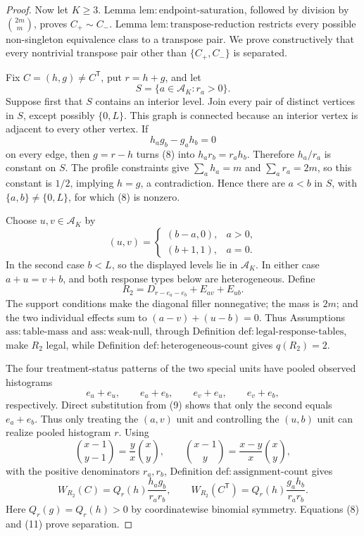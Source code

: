 \documentclass{article}
\begin{document}
\begin{proof}
Now let \(K\geq3\). Lemma \(\mathrm{lem{:}endpoint\text{-}saturation}\), followed by division by \(\binom{2m}{m}\), proves \(C_+\sim C_-\). Lemma \(\mathrm{lem{:}transpose\text{-}reduction}\) restricts every possible non-singleton equivalence class to a transpose pair. We prove constructively that every nontrivial transpose pair other than \(\{C_+,C_-\}\) is separated.

Fix \(C=(h,g)\neq C^{\mathsf T}\), put \(r=h+g\), and let
\[
 S=\{a\in\mathcal A_K:r_a>0\}.
\]
Suppose first that \(S\) contains an interior level. Join every pair of distinct vertices in \(S\), except possibly \(\{0,L\}\). This graph is connected because an interior vertex is adjacent to every other vertex. If
\[
 h_ag_b-g_ah_b=0
 \tag{8}
\]
on every edge, then \(g=r-h\) turns (8) into \(h_ar_b=r_ah_b\). Therefore \(h_a/r_a\) is constant on \(S\). The profile constraints give \(\sum_a h_a=m\) and \(\sum_a r_a=2m\), so this constant is \(1/2\), implying \(h=g\), a contradiction. Hence there are \(a<b\) in \(S\), with \(\{a,b\}\neq\{0,L\}\), for which (8) is nonzero.

Choose \(u,v\in\mathcal A_K\) by
\[
 (u,v)=
 \begin{cases}
 (b-a,0),&a>0,\\
 (b+1,1),&a=0.
 \end{cases}
 \tag{9}
\]
In the second case \(b<L\), so the displayed levels lie in \(\mathcal A_K\). In either case \(a+u=v+b\), and both response types below are heterogeneous. Define
\[
 R_2=D_{r-e_a-e_b}+E_{av}+E_{ub}.
 \tag{10}
\]
The support conditions make the diagonal filler nonnegative; the mass is \(2m\); and the two individual effects sum to \((a-v)+(u-b)=0\). Thus Assumptions \(\mathrm{ass{:}table\text{-}mass}\) and \(\mathrm{ass{:}weak\text{-}null}\), through Definition \(\mathrm{def{:}legal\text{-}response\text{-}tables}\), make \(R_2\) legal, while Definition \(\mathrm{def{:}heterogeneous\text{-}count}\) gives \(q(R_2)=2\).

The four treatment-status patterns of the two special units have pooled observed histograms
\[
 e_a+e_u,\qquad e_a+e_b,\qquad e_v+e_u,\qquad e_v+e_b,
\]
respectively. Direct substitution from (9) shows that only the second equals \(e_a+e_b\). Thus only treating the \((a,v)\) unit and controlling the \((u,b)\) unit can realize pooled histogram \(r\). Using
\[
 \binom{x-1}{y-1}=\frac yx\binom xy,
 \qquad
 \binom{x-1}{y}=\frac{x-y}{x}\binom xy,
\]
with the positive denominators \(r_a,r_b\), Definition \(\mathrm{def{:}assignment\text{-}count}\) gives
\[
 W_{R_2}(C)=Q_r(h)\frac{h_ag_b}{r_ar_b},
 \qquad
 W_{R_2}(C^{\mathsf T})=Q_r(h)\frac{g_ah_b}{r_ar_b}.
 \tag{11}
\]
Here \(Q_r(g)=Q_r(h)>0\) by coordinatewise binomial symmetry. Equations (8) and (11) prove separation.


\end{proof}
\end{document}
